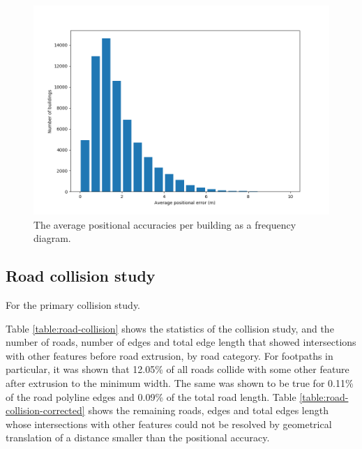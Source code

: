 \documentclass[a4paper]{article}
\begin{document}
\begin{figure}[H]
    \centering
    \includegraphics[width=\textwidth,height=0.5\textheight,keepaspectratio]{img_pos_error_plot}
    \caption{The average positional accuracies per building as a frequency diagram.}
    \label{fig:bar-plot-positional-accuracy}
\end{figure}

\subsection{Road collision study}

For the primary collision study.

Table \ref{table:road-collision} shows the statistics of the collision study, and the number of roads, number of edges and total edge length that showed intersections with other features before road extrusion, by road category.
For footpaths in particular, it was shown that 12.05\% of all roads collide with some other feature after extrusion to the minimum width.
The same was shown to be true for 0.11\% of the road polyline edges and 0.09\% of the total road length.
Table \ref{table:road-collision-corrected} shows the remaining roads, edges and total edges length whose intersections with other features could not be resolved by geometrical translation of a distance smaller than the positional accuracy.
\end{document}
